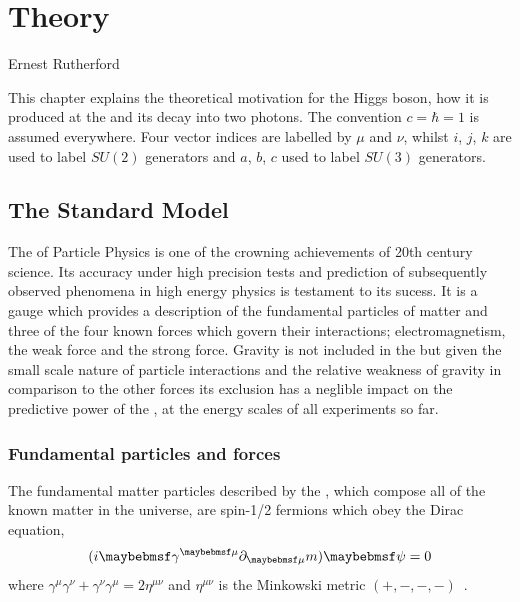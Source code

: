 \chapter{Theory}
\label{chap:theory}
{Ernest Rutherford}

This chapter explains the theoretical motivation for the Higgs boson, how it is produced at the \LHC and its decay into two photons. The convention $c=\hbar=1$ is assumed everywhere. Four vector indices are labelled by $\mu$ and $\nu$, whilst $i$, $j$, $k$ are used to label $SU(2)$ generators and $a$, $b$, $c$ used to label $SU(3)$ generators.

\section{The Standard Model}
\label{sec:standardmodel}

The \SM of Particle Physics is one of the crowning achievements of 20th century science. Its accuracy under high precision tests and prediction of subsequently observed phenomena in high energy physics is testament to its sucess. It is a gauge \QFT which provides a description of the fundamental particles of matter and three of the four known forces which govern their interactions; electromagnetism, the weak force and the strong force. Gravity is not included in the \SM but given the small scale nature of particle interactions and the relative weakness of gravity in comparison to the other forces its exclusion has a neglible impact on the predictive power of the \SM, at the energy scales of all experiments so far. 

\subsection{Fundamental particles and forces}

The fundamental matter particles described by the \SM, which compose all of the known matter in the universe, are spin-1/2 fermions which obey the Dirac equation,
\begin{equation}
  (i\gamma^{\mu}\partial_{\mu}\-m)\psi=0
  \label{eq:dirac}
\end{equation}
where $\gamma^{\mu}\gamma^{\nu}+\gamma^{\nu}\gamma^{\mu}=2\eta^{\mu\nu}$ and $\eta^{\mu\nu}$ is the Minkowski metric $(+,-,-,-)$~\cite{Halzen}.

